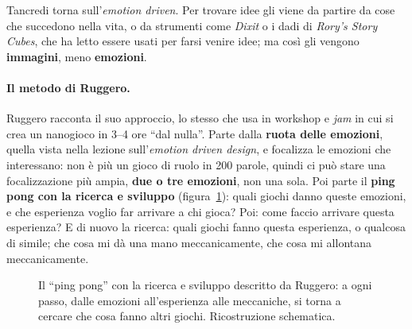 Tancredi torna sull'\emph{emotion driven}. Per trovare idee gli viene da partire da
cose che succedono nella vita, o da strumenti come \emph{Dixit} o i dadi di
\emph{Rory's Story Cubes}, che ha letto essere usati per farsi venire idee; ma così gli
vengono \textbf{immagini}, meno \textbf{emozioni}.

\paragraph{Il metodo di Ruggero.} Ruggero racconta il suo approccio, lo stesso che usa
in workshop e \emph{jam} in cui si crea un nanogioco in 3--4 ore ``dal nulla''. Parte
dalla \textbf{ruota delle emozioni}, quella vista nella lezione sull'\emph{emotion
driven design}, e focalizza le emozioni che interessano: non è più un gioco di ruolo
in 200 parole, quindi ci può stare una focalizzazione più ampia, \textbf{due o tre
emozioni}, non una sola. Poi parte il \textbf{ping pong con la ricerca e sviluppo}
(figura~\ref{a7:fig:pingpong}): quali giochi danno queste emozioni, e che esperienza
voglio far arrivare a chi gioca? Poi: come faccio arrivare questa esperienza? E di
nuovo la ricerca: quali giochi fanno questa esperienza, o qualcosa di simile; che cosa
mi dà una mano meccanicamente, che cosa mi allontana meccanicamente.

\begin{figure}[htbp]
\centering
{}
\caption{Il ``ping pong'' con la ricerca e sviluppo descritto da Ruggero: a ogni
passo, dalle emozioni all'esperienza alle meccaniche, si torna a cercare che cosa
fanno altri giochi. Ricostruzione schematica.}
\label{a7:fig:pingpong}
\end{figure}

